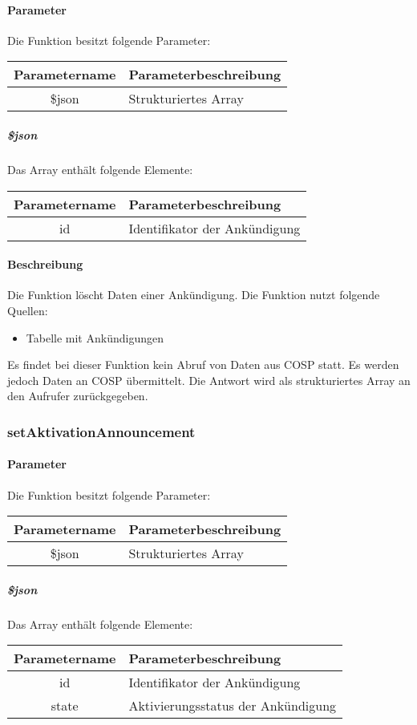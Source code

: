 \paragraph{Parameter} Die Funktion besitzt folgende Parameter:
\begin{table}[H]
	\begin{tabular}{|c|p{11cm}|}
		\hline
		\textbf{Parametername} & \textbf{Parameterbeschreibung} \\ \hline
		\$json & Strukturiertes Array \\ \hline
	\end{tabular}
\end{table}
\subparagraph{\$json}Das Array enthält folgende Elemente:
\begin{table}[H]
	\begin{tabular}{|c|p{11cm}|}
		\hline
		\textbf{Parametername} & \textbf{Parameterbeschreibung} \\ \hline
		id   & Identifikator der Ankündigung \\ \hline
	\end{tabular}
\end{table}
\paragraph{Beschreibung} Die Funktion löscht Daten einer Ankündigung. Die Funktion nutzt folgende Quellen:
\begin{itemize}
	\item Tabelle mit Ankündigungen
\end{itemize}
Es findet bei dieser Funktion kein Abruf von Daten aus {\glqq COSP\grqq} statt. Es werden jedoch Daten an {\glqq COSP\grqq} übermittelt. Die Antwort wird als strukturiertes Array an den Aufrufer zurückgegeben.
\subsubsection{setAktivationAnnouncement}
\paragraph{Parameter} Die Funktion besitzt folgende Parameter:
\begin{table}[H]
	\begin{tabular}{|c|p{11cm}|}
		\hline
		\textbf{Parametername} & \textbf{Parameterbeschreibung} \\ \hline
		\$json & Strukturiertes Array \\ \hline
	\end{tabular}
\end{table}
\subparagraph{\$json}Das Array enthält folgende Elemente:
\begin{table}[H]
	\begin{tabular}{|c|p{11cm}|}
		\hline
		\textbf{Parametername} & \textbf{Parameterbeschreibung} \\ \hline
		id      & Identifikator der Ankündigung \\ \hline
		state   & Aktivierungsstatus der Ankündigung \\ \hline
	\end{tabular}
\end{table}
